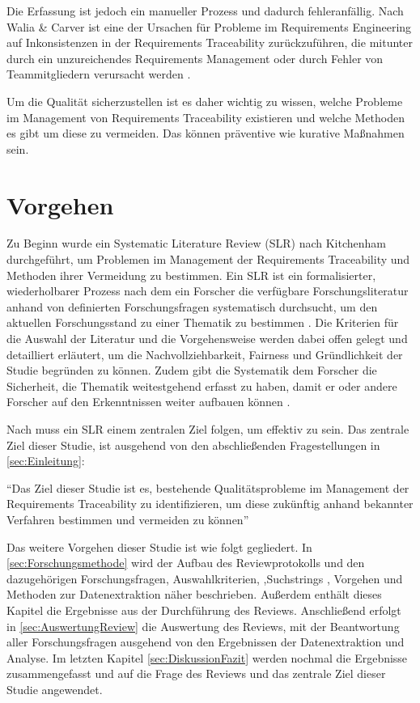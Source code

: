 Die Erfassung ist jedoch ein manueller Prozess und dadurch fehleranfällig. Nach Walia \& Carver ist eine der Ursachen für Probleme im Requirements Engineering auf Inkonsistenzen in der Requirements Traceability zurückzuführen, die mitunter durch ein unzureichendes Requirements Management oder durch Fehler von Teammitgliedern verursacht werden \cite{Walia2009AErrors}. 

Um die Qualität sicherzustellen ist es daher wichtig zu wissen, welche Probleme im Management von Requirements Traceability existieren und welche Methoden es gibt um diese zu vermeiden. Das können präventive wie kurative Maßnahmen sein.

\section{Vorgehen}
Zu Beginn wurde ein Systematic Literature Review (SLR) nach Kitchenham durchgeführt, um Problemen im Management der Requirements Traceability und Methoden ihrer Vermeidung zu bestimmen.
Ein SLR ist ein formalisierter, wiederholbarer Prozess nach dem ein Forscher die verfügbare Forschungsliteratur anhand von definierten Forschungsfragen systematisch durchsucht, um den aktuellen Forschungsstand zu einer Thematik zu bestimmen \cite{Walia2009AErrors}. Die Kriterien für die Auswahl der Literatur und die Vorgehensweise werden dabei offen gelegt und detailliert erläutert, um die Nachvollziehbarkeit, Fairness und Gründlichkeit der Studie begründen zu können. Zudem gibt die Systematik dem Forscher die Sicherheit, die Thematik weitestgehend erfasst zu haben, damit er oder andere Forscher auf den Erkenntnissen weiter aufbauen können \cite{SystematischesArbeiten,Keele2007GuidelinesEngineering}.

Nach \cite{Walia2009AErrors} muss ein SLR einem zentralen Ziel folgen, um effektiv zu sein. Das zentrale Ziel dieser Studie, ist ausgehend von den abschließenden Fragestellungen in \ref{sec:Einleitung}:

\enquote{Das Ziel dieser Studie ist es, bestehende Qualitätsprobleme im Management der Requirements Traceability zu identifizieren, um diese zukünftig anhand bekannter Verfahren bestimmen und vermeiden zu können}

Das weitere Vorgehen dieser Studie ist wie folgt gegliedert. In \ref{sec:Forschungsmethode} wird der Aufbau des Reviewprotokolls und den dazugehörigen Forschungsfragen, Auswahlkriterien, ,Suchstrings , Vorgehen und Methoden zur Datenextraktion näher beschrieben. Außerdem enthält dieses Kapitel die Ergebnisse aus der Durchführung des Reviews. Anschließend erfolgt in \ref{sec:AuswertungReview} die Auswertung des Reviews, mit der Beantwortung aller Forschungsfragen ausgehend von den Ergebnissen der Datenextraktion und Analyse. Im letzten Kapitel \ref{sec:DiskussionFazit} werden nochmal die Ergebnisse zusammengefasst und auf die Frage des Reviews und das zentrale Ziel dieser Studie angewendet.